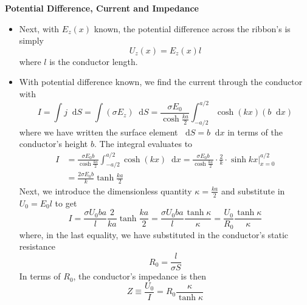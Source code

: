 \documentclass[11pt, a4paper]{article}
\newcommand{\diff}{\mathop{}\!\mathrm{d}} %
\begin{document}
\textbf{Potential Difference, Current and Impedance}
\begin{itemize}
	
	\item Next, with $ E_{z}(x) $ known, the potential difference across the ribbon's is simply
	\begin{equation*}
		U_{z}(x) = E_{z}(x) l
	\end{equation*}
	where $ l $ is the conductor length. 
	
	\item With potential difference known, we find the current through the conductor with
	\begin{equation*}
		I = \int j \diff S = \int (\sigma E_{z}) \diff S = \frac{\sigma E_{0}}{\cosh \frac{ka}{2}} \int_{-a/2}^{a/2} \cosh(kx) (b \diff x)
	\end{equation*}
	where we have written the surface element $ \diff S = b \diff x $ in terms of the conductor's height $ b $. The integral evaluates to
	\begin{align*}
		I &= \frac{\sigma E_{0} b}{\cosh \frac{ka}{2}} \int_{-a/2}^{a/2} \cosh(kx) \diff x =  \frac{\sigma E_{0} b}{\cosh \frac{ka}{2}}  \cdot \frac{2}{k} \cdot \sinh kx \Big |_{x = 0}^{a/2} \\
		& =  \frac{2\sigma E_{0} b}{k} \tanh \frac{ka}{2}
	\end{align*} 
	Next, we introduce the dimensionless quantity $ \kappa = \frac{ka}{2} $ and substitute in $ U_{0} = E_{0} l$ to get
	\begin{equation*}
		I = \frac{\sigma U_{0} b a}{l} \frac{2}{ka}\tanh \frac{ka}{2} = \frac{\sigma U_{0} b a}{l} \frac{\tanh \kappa}{\kappa} = \frac{U_{0}}{R_{0}} \frac{\tanh \kappa}{\kappa}
	\end{equation*}
	where, in the last equality, we have substituted in the conductor's static resistance
	\begin{equation*}
		R_{0} = \frac{l}{\sigma S}
	\end{equation*}
	In terms of $ R_{0} $, the conductor's impedance is then
	\begin{equation*}
		Z \equiv \frac{U_{0}}{I} = R_{0}\frac{\kappa}{\tanh \kappa}
	\end{equation*}
\end{itemize}	
\end{document}
